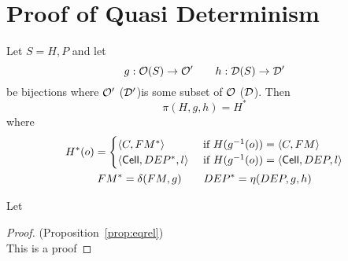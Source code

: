 \chapter{Proof of Quasi Determinism}

\begin{definition} \label{def:pi}
  Let $S = H, P$ and let 
  \begin{equation*}
    g: \mathcal{O}(S) \to \mathcal{O}' \quad\quad h: \mathcal{D}(S) \to \mathcal{D}' 
  \end{equation*}
  be bijections where $\mathcal{O}'$ ($\mathcal{D}'$)is some subset of $\mathcal{O}$ ($\mathcal{D}$).
  Then 
  \begin{equation}
    \pi(H, g, h) = H^*
  \end{equation}
  where
  \begin{equation}
    \begin{gathered}
      H^*(o) =
      \begin{cases}
        \mbox{$\langle C, FM^* \rangle$}   & \text{ if } H(g^{-1}(o)) = \mbox{$\langle C, FM \rangle$} \\
        \mbox{$\langle \mbox{$\mathsf{Cell}$}{}, DEP^*, l \rangle$} & \text{ if } H(g^{-1}(o)) = \mbox{$\langle \mbox{$\mathsf{Cell}$}{}, DEP, l \rangle$}
      \end{cases} \\
      FM^* = \delta(FM, g) \quad\quad DEP^* = \eta(DEP, g, h)
    \end{gathered}
  \end{equation}
\end{definition}

\begin{notation}
\end{notation}

\begin{definition} \label{def:rho}
  Let 
\end{definition}

\begin{proof}{(Proposition~\ref{prop:eqrel})} \\
  This is a proof
\end{proof}
